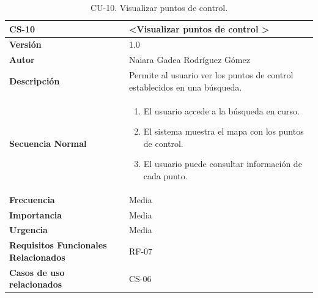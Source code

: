 \begin{table}[htbp] %
\centering
\begin{tabular}{ |m{3cm}|m{11cm}|  } 
\hline
\cellcolor[HTML]{B9E3F0}\centering\textbf{CS-10} & \cellcolor[HTML]{B9E3F0}\textbf{\textless Visualizar puntos de control \textgreater}\\

\hline
\cellcolor[HTML]{EFEFEF}\textbf{Versión}             & 1.0  \\
\hline
\cellcolor[HTML]{EFEFEF}\textbf{Autor}                & Naiara Gadea Rodríguez Gómez\\
\hline
\cellcolor[HTML]{EFEFEF}\textbf{Descripción}                & { Permite al usuario ver los puntos de control establecidos en una búsqueda. }\\
\hline
\cellcolor[HTML]{EFEFEF}\textbf{Secuencia \newline Normal}                &                 
        \begin{enumerate}
            \item El usuario accede a la búsqueda en curso.
            \item El sistema muestra el mapa con los puntos de control.
            \item El usuario puede consultar información de cada punto.
        \end{enumerate}\\
\hline
\cellcolor[HTML]{EFEFEF}\textbf{Frecuencia}                & Media\\
\hline
\cellcolor[HTML]{EFEFEF}\textbf{Importancia}                & Media\\
\hline
\cellcolor[HTML]{EFEFEF}\textbf{Urgencia}                & Media\\
\hline
\cellcolor[HTML]{EFEFEF}\textbf{Requisitos Funcionales Relacionados}                & { RF-07 }\\
\hline
\cellcolor[HTML]{EFEFEF}\textbf{Casos de uso relacionados}                & { CS-06 }\\
\hline
\end{tabular}
\caption{CU-10. Visualizar puntos de control.}
\end{table}


